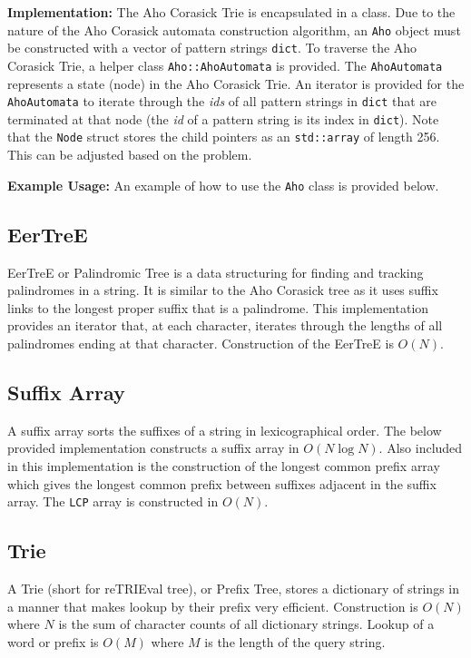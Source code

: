 \documentclass[letterpaper,11pt,twoside]{article}
\begin{document}
                \textbf{Implementation:} The Aho Corasick Trie is encapsulated in a class.
                Due to the nature of the Aho Corasick automata construction algorithm, an \verb|Aho| object must be constructed with a vector of pattern strings \verb|dict|.
                To traverse the Aho Corasick Trie, a helper class \verb|Aho::AhoAutomata| is provided.
                The \verb|AhoAutomata| represents a state (node) in the Aho Corasick Trie.
                An iterator is provided for the \verb|AhoAutomata| to iterate through the \emph{ids} of all pattern strings in \verb|dict| that are terminated at that node (the \emph{id} of a pattern string is its index in \verb|dict|).
                Note that the \verb|Node| struct stores the child pointers as an \verb|std::array| of length 256.
                This can be adjusted based on the problem.
                

                \textbf{Example Usage:} An example of how to use the \verb|Aho| class is provided below.
                
            \subsection{EerTreE}
                EerTreE or Palindromic Tree is a data structuring for finding and tracking palindromes in a string.
                It is similar to the Aho Corasick tree as it uses suffix links to the longest proper suffix that is a palindrome.
                This implementation provides an iterator that, at each character, iterates through the lengths of all palindromes ending at that character.
                Construction of the EerTreE is $O(N)$.
                
            \subsection{Suffix Array}
                A suffix array sorts the suffixes of a string in lexicographical order.
                The below provided implementation constructs a suffix array in $O(N\log N)$.
                Also included in this implementation is the construction of the longest common prefix array which gives the longest common prefix between suffixes adjacent in the suffix array.
                The \verb|LCP| array is constructed in $O(N)$.
                
            \subsection{Trie} \label{trie}
                A Trie (short for reTRIEval tree), or Prefix Tree, stores a dictionary of strings in a manner that makes lookup by their prefix very efficient.
                Construction is $O(N)$ where $N$ is the sum of character counts of all dictionary strings.
                Lookup of a word or prefix is $O(M)$ where $M$ is the length of the query string.
                
\end{document}
